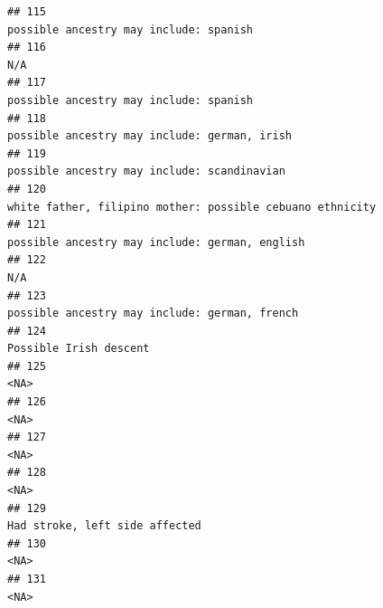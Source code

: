 \documentclass[]{article}
\begin{document}
\begin{verbatim}
## 115                                                                                                              possible ancestry may include: spanish
## 116                                                                                                                                                 N/A
## 117                                                                                                              possible ancestry may include: spanish
## 118                                                                                                        possible ancestry may include: german, irish
## 119                                                                                                         possible ancestry may include: scandinavian
## 120                                                                                           white father, filipino mother: possible cebuano ethnicity
## 121                                                                                                      possible ancestry may include: german, english
## 122                                                                                                                                                 N/A
## 123                                                                                                       possible ancestry may include: german, french
## 124                                                                                                                              Possible Irish descent
## 125                                                                                                                                                <NA>
## 126                                                                                                                                                <NA>
## 127                                                                                                                                                <NA>
## 128                                                                                                                                                <NA>
## 129                                                                                                                      Had stroke, left side affected
## 130                                                                                                                                                <NA>
## 131                                                                                                                                                <NA>

\end{verbatim}
\end{document}
